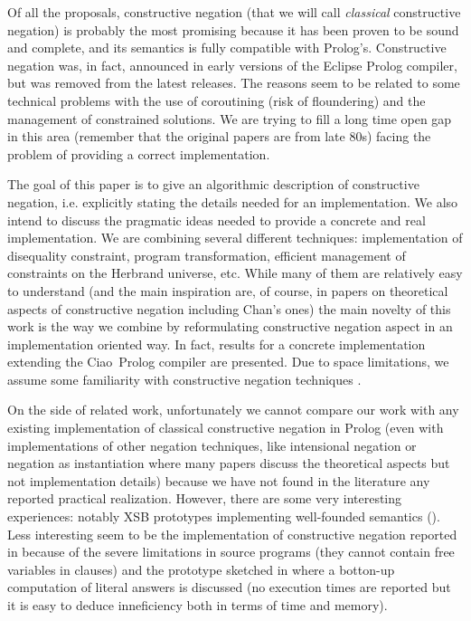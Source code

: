 \documentclass{llncs}
\newcommand{\ciao}{Ciao}
\begin{document}
Of all the proposals, constructive negation \cite{Chan1,Chan2} (that
we will call \emph{classical} constructive negation) is probably the
most promising because it has been proven to be sound and complete,
and its semantics is fully compatible with Prolog's. Constructive
negation was, in fact, announced in early versions of the Eclipse
Prolog compiler, but was removed from the latest releases.  The
reasons seem to be related to some technical problems with the use of
coroutining (risk of floundering) and the management of constrained
solutions. We are trying to fill a long time open gap in this area
(remember that the original papers are from late 80s) facing the
problem of providing a correct implementation.

The goal of this paper is to give an algorithmic description of
constructive negation, i.e. explicitly stating the details needed for
an implementation. We also intend to discuss the pragmatic ideas
needed to provide a concrete and real implementation.  We are
combining several different techniques: implementation of disequality
constraint, program transformation, efficient management of
constraints on the Herbrand universe, etc. While many of them are
relatively easy to understand (and the main inspiration are, of
course, in papers on theoretical aspects of constructive negation
including Chan's ones) the main novelty of this work is the way we
combine by reformulating constructive negation aspect in an
implementation oriented way.  In fact, results for a concrete
implementation extending the \ciao\ Prolog compiler are presented.
Due to space limitations, we assume some familiarity with constructive
negation techniques \cite{Chan1,Chan2}.

On the side of related work, unfortunately we cannot compare our work
with any existing implementation of classical constructive negation in
Prolog (even with implementations of other negation techniques, like
intensional negation \cite{Barbuti1,Bruscoli,SusanaFLOPS04} or negation
as instantiation \cite{DiPierro} where many papers discuss the
theoretical aspects but not implementation details) because we have
not found in the literature any reported practical
realization. However, there are some very interesting experiences:
notably XSB prototypes implementing well-founded semantics
(\cite{Alferes95}). Less interesting seem to be the implementation of
constructive negation reported in \cite{Bartak} because of the severe
limitations in source programs (they cannot contain free variables in
clauses) and the prototype sketched in \cite{BNC-cneg} where a
botton-up computation of literal answers is discussed (no execution
times are reported but it is easy to deduce inneficiency both in terms
of time and memory).
\end{document}
